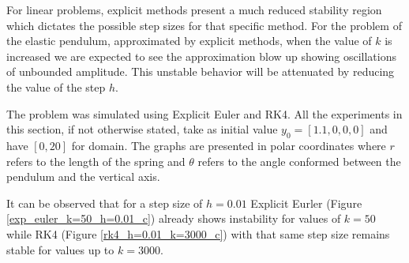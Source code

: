 \documentclass{report}
\begin{document}
For linear problems, explicit methods present a much reduced stability region which dictates the possible step sizes for that specific method.
For the problem of the elastic pendulum, approximated by explicit methods, when the value of $k$ is increased we are expected to see the approximation blow up showing oscillations of unbounded amplitude.
This unstable behavior will be attenuated by reducing the value of the step $h$.

The problem was simulated using Explicit Euler and RK4.
All the experiments in this section, if not otherwise stated, take as initial value $y_0 = [1.1, 0, 0, 0]$ and have $[0, 20]$ for domain.
The graphs are presented in polar coordinates where $r$ refers to the length of the spring and $\theta$ refers to the angle conformed between the pendulum and the vertical axis.

It can be observed that for a step size of $h=0.01$ Explicit Eurler (Figure \ref{exp_euler_k=50_h=0.01_c}) already shows instability for values of $k=50$ while RK4 (Figure \ref{rk4_h=0.01_k=3000_c}) with that same step size remains stable for values up to $k=3000$.
\end{document}
